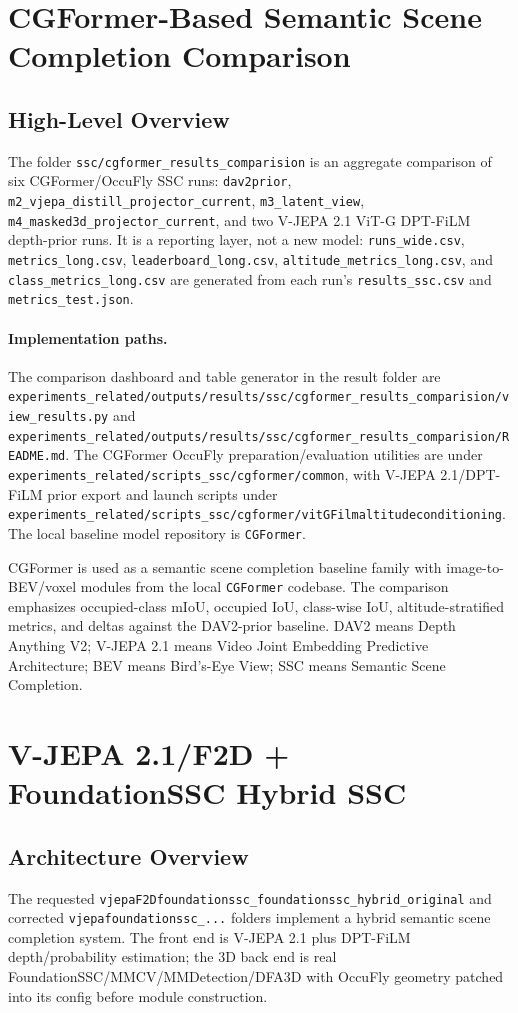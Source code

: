 \documentclass[10pt]{article}
\newcommand{\codepath}[1]{\begingroup\small\nolinkurl{#1}\endgroup}
\begin{document}
\section{CGFormer-Based Semantic Scene Completion Comparison}
\subsection{High-Level Overview}
The folder \codepath{ssc/cgformer_results_comparision} is an aggregate comparison of six CGFormer/OccuFly SSC runs: \codepath{dav2prior}, \codepath{m2_vjepa_distill_projector_current}, \codepath{m3_latent_view}, \codepath{m4_masked3d_projector_current}, and two V-JEPA 2.1 ViT-G DPT-FiLM depth-prior runs.  It is a reporting layer, not a new model: \codepath{runs_wide.csv}, \codepath{metrics_long.csv}, \codepath{leaderboard_long.csv}, \codepath{altitude_metrics_long.csv}, and \codepath{class_metrics_long.csv} are generated from each run's \codepath{results_ssc.csv} and \codepath{metrics_test.json}.

\paragraph{Implementation paths.}
The comparison dashboard and table generator in the result folder are \codepath{experiments_related/outputs/results/ssc/cgformer_results_comparision/view_results.py} and \codepath{experiments_related/outputs/results/ssc/cgformer_results_comparision/README.md}.  The CGFormer OccuFly preparation/evaluation utilities are under \codepath{experiments_related/scripts_ssc/cgformer/common}, with V-JEPA 2.1/DPT-FiLM prior export and launch scripts under \codepath{experiments_related/scripts_ssc/cgformer/vitGFilmaltitudeconditioning}.  The local baseline model repository is \codepath{CGFormer}.

CGFormer is used as a semantic scene completion baseline family with image-to-BEV/voxel modules from the local \texttt{CGFormer} codebase.  The comparison emphasizes occupied-class mIoU, occupied IoU, class-wise IoU, altitude-stratified metrics, and deltas against the DAV2-prior baseline.  DAV2 means Depth Anything V2; V-JEPA 2.1 means Video Joint Embedding Predictive Architecture; BEV means Bird's-Eye View; SSC means Semantic Scene Completion.

\section{V-JEPA 2.1/F2D + FoundationSSC Hybrid SSC}
\subsection{Architecture Overview}
The requested \codepath{vjepaF2Dfoundationssc_foundationssc_hybrid_original} and corrected \codepath{vjepafoundationssc_...} folders implement a hybrid semantic scene completion system.  The front end is V-JEPA 2.1 plus DPT-FiLM depth/probability estimation; the 3D back end is real FoundationSSC/MMCV/MMDetection/DFA3D with OccuFly geometry patched into its config before module construction.
\end{document}
